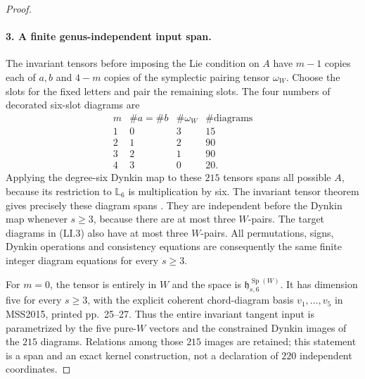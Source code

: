 \begin{proof}
\paragraph{3. A finite genus-independent input span.}
The invariant tensors before imposing the Lie condition on
$A$ have $m-1$ copies each of $a,b$ and $4-m$ copies of the
symplectic pairing tensor $\omega_W$. Choose the slots for
the fixed letters and pair the remaining slots. The four
numbers of decorated six-slot diagrams are
\[
 \begin{array}{c|r|r|r}
 m&\#a=\#b&\#\omega_W&\#\text{diagrams}\\\hline
 1&0&3&15\\
 2&1&2&90\\
 3&2&1&90\\
 4&3&0&20.
 \end{array}                                                \tag{LI.4}
\]
Applying the degree-six Dynkin map to these $215$ tensors
spans all possible $A$, because its restriction to
$\mathbb L_6$ is multiplication by six. The invariant
tensor theorem gives precisely these diagram spans
\cite[Proposition~2.1, p.~8]{AuditMoritaSakasaiSuzuki2015v2}. They
are independent before the Dynkin map whenever $s\geq3$,
because there are at most three $W$-pairs. The target
diagrams in (LI.3) also have at most three $W$-pairs.
All permutations, signs, Dynkin operations and consistency
equations are consequently the same finite integer
diagram equations for every $s\geq3$.

For $m=0$, the tensor is entirely in $W$ and the space is
$\mathfrak h_{s,6}^{\operatorname{Sp}(W)}$. It has dimension
five for every $s\geq3$, with the explicit coherent
chord-diagram basis $v_1,\ldots,v_5$ in MSS2015,
printed pp.~25--27\cite{AuditMoritaSakasaiSuzuki2015v2}. Thus the entire invariant tangent
input is parametrized by the five pure-$W$ vectors and
the constrained Dynkin images of the $215$ diagrams.
Relations among those $215$ images are retained; this
statement is a span and an exact kernel construction,
not a declaration of $220$ independent coordinates.



\end{proof}
